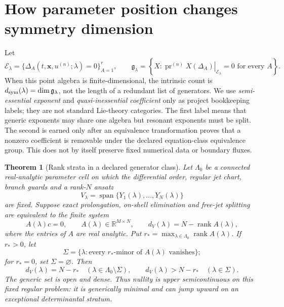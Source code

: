 \documentclass[11pt]{article}
\newtheorem{theorem}{Theorem}[section]
\theoremstyle{definition}
\newcommand{\pr}{\operatorname{pr}}
\begin{document}
\section{How parameter position changes symmetry dimension}
\label{sec:parameter-effects}
Let
\begin{equation}
 \mathcal E_\lambda
 =\{\Delta_A(t,\mathbf x,u^{(n)};\lambda)=0\}_{A=1}^r,
 \qquad
 \mathfrak g_\lambda
 =\left\{X:\left.\pr^{(n)}X(\Delta_A)\right|_{\mathcal E_\lambda}=0
 \text{ for every }A\right\}.
 \label{eq:parameter-algebra}
\end{equation}
When this point algebra is finite-dimensional, the intrinsic count is
$d_{\rm sym}(\lambda)=\dim\mathfrak g_\lambda$, not the length of a redundant
list of generators. We use \emph{semi-essential exponent} and
\emph{quasi-inessential coefficient} only as project bookkeeping labels; they
are not standard Lie-theory categories. The first label means that generic
exponents may share one algebra but resonant exponents must be split. The
second is earned only after an equivalence transformation proves that a
nonzero coefficient is removable under the declared equation-class
equivalence group. This does not by itself preserve fixed numerical data or
boundary fluxes.

\begin{theorem}[Rank strata in a declared generator class]
\label{thm:parameter-rank-strata}
Let $\Lambda_0$ be a connected real-analytic parameter cell on which the
differential order, regular jet chart, branch guards and a rank-$N$ ansatz
\[
 V_\lambda=\operatorname{span}\{Y_1(\lambda),\ldots,Y_N(\lambda)\}
\]
are fixed. Suppose exact prolongation, on-shell elimination and free-jet
splitting are equivalent to the finite system
\begin{equation}
 A(\lambda)c=0,
 \qquad A(\lambda)\in\mathbb R^{M\times N},
 \qquad d_V(\lambda)=N-\operatorname{rank}A(\lambda),
 \label{eq:determining-rank}
\end{equation}
where the entries of $A$ are real analytic. Put
$r_*=\max_{\lambda\in\Lambda_0}\operatorname{rank}A(\lambda)$. If $r_*>0$, let
\[
 \Sigma=\{\lambda:\text{every }r_*\text{-minor of }A(\lambda)
                    \text{ vanishes}\};
\]
for $r_*=0$, set $\Sigma=\varnothing$. Then
\begin{equation}
 d_V(\lambda)=N-r_*\quad(\lambda\in\Lambda_0\setminus\Sigma),
 \qquad
 d_V(\lambda)>N-r_*\quad(\lambda\in\Sigma).
 \label{eq:nullity-strata}
\end{equation}
The generic set is open and dense. Thus nullity is upper semicontinuous on
this fixed regular problem: it is generically minimal and can jump upward on
an exceptional determinantal stratum.
\end{theorem}
\end{document}
